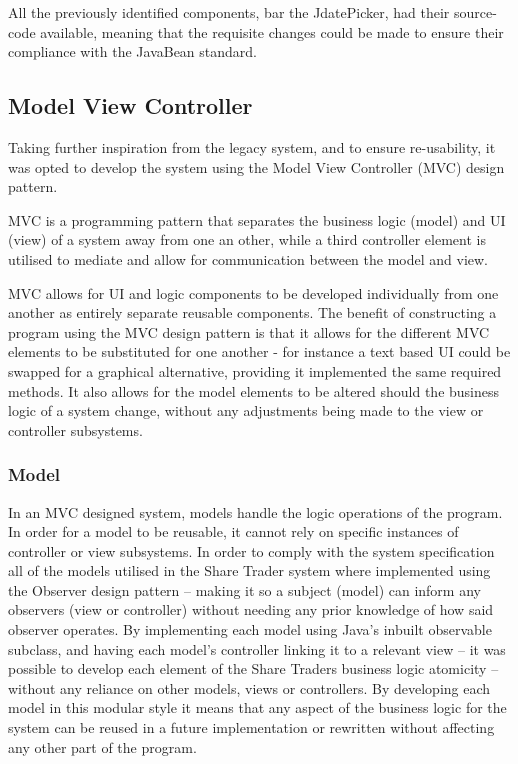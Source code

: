 \documentclass[12pt, a4paper,titlepage]{article}
\begin{document}
All the previously identified components, bar the JdatePicker, had their
source-code available, meaning that the requisite changes could be made to
ensure their compliance with the JavaBean standard.

\subsection{Model View Controller}
Taking further inspiration from the legacy system, and to ensure re-usability,
it was opted to develop the system using the Model View Controller (MVC)
design pattern.

MVC is a programming  pattern that separates the business logic (model) and UI
(view) of a system away from one an other, while a third controller element is
utilised to mediate and allow for communication between the model and view. 

MVC allows for UI and logic components to be developed individually from one
another as entirely separate reusable components.  The benefit of constructing
a program using the MVC  design pattern is that it allows for the different
MVC elements to be substituted for one another - for instance a text based UI
could be swapped for a graphical alternative, providing it implemented the
same required methods.
It also allows for the model elements to be altered should the business logic
of a system change, without any adjustments being made to the view or
controller subsystems.

\subsubsection{Model}
In an MVC designed system, models handle the logic operations of the program.
In order for a model to be reusable, it cannot rely on specific instances of
controller or view subsystems. In order to comply with the system
specification all of the models utilised in the Share Trader system where
implemented using the Observer design pattern –  making it so a subject
(model) can inform any observers (view or controller) without needing any
prior knowledge of how said observer operates.  By implementing each model
using Java’s inbuilt observable subclass, and having each model’s controller
linking it to a relevant view – it was possible to develop each element of the
Share Traders business logic atomicity – without any reliance on other models,
views or controllers.
By developing each model in this modular style it means that any aspect of the
business logic for the system can be reused in a future implementation or
rewritten without affecting any other part of the program.
\end{document}
